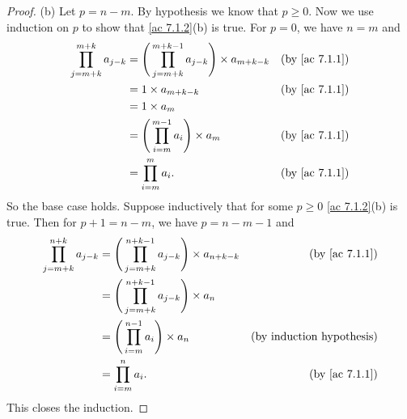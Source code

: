 \begin{proof}{(b)}
  Let \(p = n - m\).
  By hypothesis we know that \(p \geq 0\).
  Now we use induction on \(p\) to show that \cref{ac 7.1.2}(b) is true.
  For \(p = 0\), we have \(n = m\) and
  \begin{align*}
    \prod_{j = m + k}^{m + k} a_{j - k} & = \Bigg(\prod_{j = m + k}^{m + k - 1} a_{j - k}\Bigg) \times a_{m + k - k} & \text{(by \cref{ac 7.1.1})} \\
                                        & = 1 \times a_{m + k - k}                                                   & \text{(by \cref{ac 7.1.1})} \\
                                        & = 1 \times a_m                                                                                           \\
                                        & = \Bigg(\prod_{i = m}^{m - 1} a_i\Bigg) \times a_m                         & \text{(by \cref{ac 7.1.1})} \\
                                        & = \prod_{i = m}^m a_i.                                                     & \text{(by \cref{ac 7.1.1})}
  \end{align*}
  So the base case holds.
  Suppose inductively that for some \(p \geq 0\) \cref{ac 7.1.2}(b) is true.
  Then for \(p + 1 = n - m\), we have \(p = n - m - 1\) and
  \begin{align*}
    \prod_{j = m + k}^{n + k} a_{j - k} & = \Bigg(\prod_{j = m + k}^{n + k - 1} a_{j - k}\Bigg) \times a_{n + k - k} & \text{(by \cref{ac 7.1.1})}      \\
                                        & = \Bigg(\prod_{j = m + k}^{n + k - 1} a_{j - k}\Bigg) \times a_n                                              \\
                                        & = \Bigg(\prod_{i = m}^{n - 1} a_i\Bigg) \times a_n                         & \text{(by induction hypothesis)} \\
                                        & = \prod_{i = m}^n a_i.                                                     & \text{(by \cref{ac 7.1.1})}
  \end{align*}
  This closes the induction.
\end{proof}

